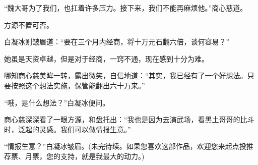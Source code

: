 \begin{this_body}
“魏大哥为了我们，也扛着许多压力。接下来，我们不能再麻烦他。”商心慈道。

方源不置可否。

白凝冰则皱眉道：“要在三个月内经商，将十万元石翻六倍，谈何容易？”

她虽是天资卓越，但是对于经商，一窍不通，现在感到十分为难。

哪知商心慈美眸一转，露出微笑，自信地道：“其实，我已经有了一个好想法。只要按照这个想法实施，保管能翻出六十万来。”

“哦，是什么想法？”白凝冰便问。

商心慈深深看了一眼方源，和盘托出：“我也是因为去演武场，看黑土哥哥的比斗时，泛起的灵感。我们可以做情报生意。”

“情报生意？”白凝冰皱眉。(未完待续。如果您喜欢这部作品，欢迎您来起点投推荐票、月票，您的支持，就是我最大的动力。)

\end{this_body}

